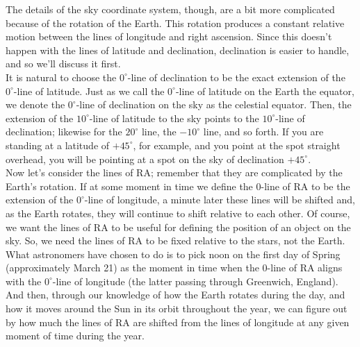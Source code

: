 \documentclass[10pt]{report}
\begin{document}
The details of the sky coordinate system, though, are a bit more complicated because of the rotation of the Earth.  This rotation produces a constant relative motion between the lines of longitude and right ascension.  Since this doesn't happen with the lines of latitude and declination, declination is easier to handle, and so we'll discuss it first.   \\
It is natural to choose the $0^\circ$-line of declination to be the exact extension of the $0^\circ$-line of latitude.  Just as we call the $0^\circ$-line of latitude on the Earth the equator, we denote the $0^\circ$-line of declination on the sky as the celestial equator.  Then, the extension of the $10^\circ$-line of latitude to the sky points to the $10^\circ$-line of declination; likewise for the $20^\circ$ line, the $-10^\circ$ line, and so forth.  If you are standing at a latitude of $+45^\circ$, for example, and you point at the spot straight overhead, you will be pointing at a spot on the sky of declination $+45^\circ$. \\
Now let's consider the lines of RA; remember that they are complicated by the Earth's rotation.  If at some moment in time we define the $0$-line of RA to be the extension of the $0^\circ$-line of longitude, a minute later these lines will be shifted and, as the Earth rotates, they will continue to shift relative to each other.  Of course, we want the lines of RA to be useful for defining the position of an object on the sky.  So, we need the lines of RA to be fixed relative to the stars, not the Earth.  What astronomers have chosen to do is to pick noon on the first day of Spring (approximately March 21) as the moment in time when the $0$-line of RA aligns with the $0^\circ$-line of longitude (the latter passing through Greenwich, England).  And then, through our knowledge of how the Earth rotates during the day, and how it moves around the Sun in its orbit throughout the year, we can figure out by how much the lines of RA are shifted from the lines of longitude at any given moment of time during the year.\\
\end{document}
